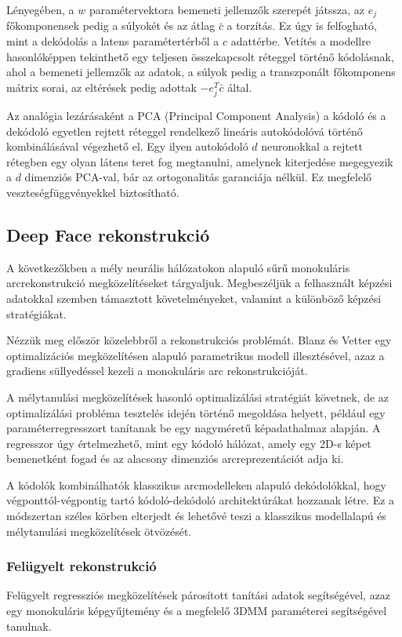 \documentclass[12pt,a4]{article}
\begin{document}
	Lényegében, a $w$ paramétervektora bemeneti jellemzők szerepét játssza, az $e_j$ főkomponensek pedig a súlyokét és az átlag $\bar{c}$ a torzítás.
	Ez úgy is felfogható, mint a dekódolás a latens paramétertérből a $c$ adattérbe. Vetítés a modellre
	hasonlóképpen tekinthető egy teljesen összekapcsolt réteggel történő kódolásnak,
	ahol a bemeneti jellemzők az adatok, a súlyok pedig a transzponált főkomponens mátrix sorai, az eltérések pedig adottak $-e^{T}_{j}\bar{c}$ által.
	
	
	 Az analógia lezárásaként a PCA (Principal Component Analysis) a kódoló és a dekódoló egyetlen rejtett réteggel rendelkező lineáris autokódolóvá történő kombinálásával végezhető el.
	Egy ilyen autokódoló $d$ neuronokkal a
	rejtett rétegben egy olyan látens teret fog megtanulni, amelynek kiterjedése megegyezik a $d$
	dimenziós PCA-val, bár az ortogonalitás garanciája nélkül.
	Ez megfelelő veszteségfüggvényekkel biztosítható.
	
	\subsection{Deep Face rekonstrukció}
	
	 A következőkben a mély neurális hálózatokon alapuló sűrű monokuláris arcrekonstrukció megközelítéseket tárgyaljuk. Megbeszéljük
	a felhasznált képzési adatokkal szemben támasztott követelményeket, valamint a különböző képzési
	stratégiákat. 
	
	
	Nézzük meg először közelebbről a rekonstrukciós problémát. Blanz és Vetter \cite{blanzvetter} egy optimalizációs megközelítésen alapuló parametrikus modell illesztésével, azaz a gradiens süllyedéssel kezeli a monokuláris arc rekonstrukcióját. 
	
	
	 A mélytanulási megközelítések hasonló optimalizálási stratégiát követnek, de az optimalizálási probléma 
	tesztelés idején történő megoldása helyett, például egy paraméterregresszort tanítanak be egy nagyméretű képadathalmaz alapján. A regresszor úgy értelmezhető, mint egy kódoló hálózat, amely egy 2D-s képet
	bemenetként fogad és az alacsony dimenziós arcreprezentációt adja ki. 
	
	
	A
	kódolók kombinálhatók klasszikus arcmodelleken alapuló dekódolókkal,
	hogy végponttól-végpontig tartó kódoló-dekódoló architektúrákat hozzanak létre.
	Ez a módszertan széles körben elterjedt és lehetővé teszi a klasszikus
	modellalapú és mélytanulási megközelítések ötvözését.
	
	\subsubsection{Felügyelt rekonstrukció}
	Felügyelt regressziós megközelítések
	párosított tanítási adatok segítségével, azaz egy monokuláris  képgyűjtemény
	és a megfelelő 3DMM paraméterei segítségével tanulnak.
	
\end{document}
